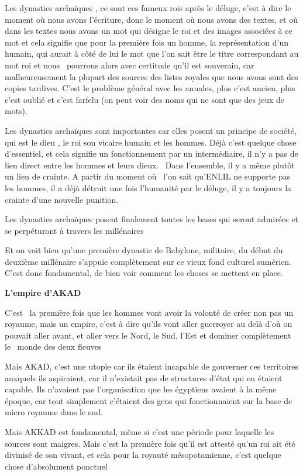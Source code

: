 \documentclass[a4paper]{article}
\begin{document}
Les dynasties archaïques , ce sont ces fameux rois après le déluge, c'est à dire le moment où nous avons l'écriture,
donc le moment où nous avons des textes, et où dans les textes nous avons un mot qui désigne le roi et des images
associées à ce mot et cela signifie que pour la première fois un homme, la représentation d'un humain, qui aurait à
côté de lui le mot que l'on sait être le titre correspondant au mot roi et nous \ pourrons alors avec certitude qu'il
est souverain, car malheureusement la plupart des sources des listes royales que nous avons sont des copies tardives.
C'est le problème général avec les annales, plus c'est ancien, plus c'est oublié et c'est farfelu (on peut voir des
noms qui ne sont que des jeux de mots).


Les dynasties archaïques sont importantes car elles posent un principe de société, qui est le dieu , le roi son vicaire
humain et les hommes. Déjà c'est quelque chose d'essentiel, et cela signifie un fonctionnement par un intermédiaire, il
n'y a pas de lien direct entre les hommes et leurs dieux. \ Dans l'ensemble, il y a même plutôt un lien de crainte. A
partir du moment où \ l'on sait qu'ENLIL ne supporte pas les hommes, il a déjà détruit une fois l'humanité par le
déluge, il y a toujours la crainte d'une nouvelle punition.

Les dynasties archaïques posent finalement toutes les bases qui seront admirées et se perpéturont à travers les
millénaires

Et on voit bien qu'une première dynastie de Babylone, militaire, du début du deuxième millénaire s'appuie complètement
sur ce vieux fond culturel sumérien. C'est donc fondamental, de bien voir comment les choses se mettent en place.


\textbf{L'empire d'AKAD}

C'est \ la première fois que les hommes vont avoir la volonté de créer non pas un royaume, mais un empire, c'est à dire
qu'ils vont aller guerroyer au delà d'où on pouvait aller avant, et aller vers le Nord, le Sud, l'Est et dominer
complètement le \ monde des deux fleuves

Mais AKAD, c'est une utopie car ils étaient incapable de gouverner ces territoires auxquels ils aspiraient, car il
n'existait pas de structures d'état qui en étaient capable. Ils n'avaient pas l'organisation que les égyptiens avaient
à la même époque, car tout simplement c'étaient des gens qui fonctionnaient sur la base de micro royaume dans le sud.

Mais AKKAD est fondamental, même si c'est une période pour laquelle les sources sont maigres. Mais c'est la première
fois qu'il est attesté qu'un roi ait été divinisé de son vivant, et cela pour la royauté mésopotamienne, c'est quelque
chose d'absolument ponctuel
\end{document}
